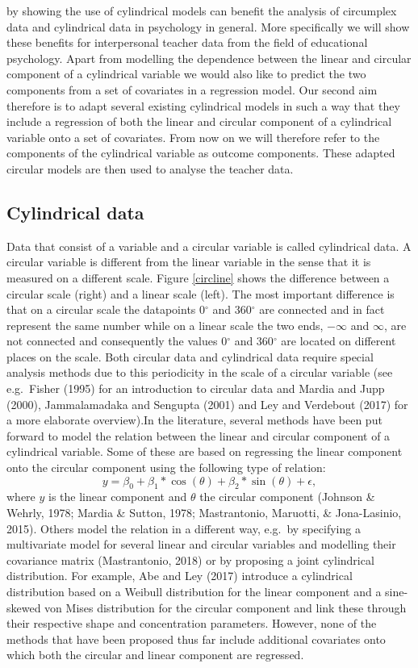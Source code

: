 \documentclass[man]{apa6}
\theoremstyle{definition}
\theoremstyle{definition}
\theoremstyle{definition}
\theoremstyle{remark}
\begin{document}
by showing the use of cylindrical models can benefit the analysis of
circumplex data and cylindrical data in psychology in general. More
specifically we will show these benefits for interpersonal teacher data
from the field of educational psychology. Apart from modelling the
dependence between the linear and circular component of a cylindrical
variable we would also like to predict the two components from a set of
covariates in a regression model. Our second aim therefore is to adapt
several existing cylindrical models in such a way that they include a
regression of both the linear and circular component of a cylindrical
variable onto a set of covariates. From now on we will therefore refer
to the components of the cylindrical variable as outcome components.
These adapted circular models are then used to analyse the teacher data.

\subsection{Cylindrical data}

Data that consist of a variable and a circular variable is called
cylindrical data. A circular variable is different from the linear
variable in the sense that it is measured on a different scale. Figure
\ref{circline} shows the difference between a circular scale (right) and
a linear scale (left). The most important difference is that on a
circular scale the datapoints 0\(^\circ\) and 360\(^\circ\) are
connected and in fact represent the same number while on a linear scale
the two ends, \(-\infty\) and \(\infty\), are not connected and
consequently the values 0\(^\circ\) and 360\(^\circ\) are located on
different places on the scale. Both circular data and cylindrical data
require special analysis methods due to this periodicity in the scale of
a circular variable (see e.g.~Fisher (1995) for an introduction to
circular data and Mardia and Jupp (2000), Jammalamadaka and Sengupta
(2001) and Ley and Verdebout (2017) for a more elaborate
overview).\newline \indent In the literature, several methods have been
put forward to model the relation between the linear and circular
component of a cylindrical variable. Some of these are based on
regressing the linear component onto the circular component using the
following type of relation: \[y = \beta_0 +
\beta_1*\cos(\theta) + \beta_2*\sin(\theta)+ \epsilon,\] where \(y\) is
the linear component and \(\theta\) the circular component (Johnson \&
Wehrly, 1978; Mardia \& Sutton, 1978; Mastrantonio, Maruotti, \&
Jona-Lasinio, 2015). Others model the relation in a different way,
e.g.~by specifying a multivariate model for several linear and circular
variables and modelling their covariance matrix (Mastrantonio, 2018) or
by proposing a joint cylindrical distribution. For example, Abe and Ley
(2017) introduce a cylindrical distribution based on a Weibull
distribution for the linear component and a sine-skewed von Mises
distribution for the circular component and link these through their
respective shape and concentration parameters. However, none of the
methods that have been proposed thus far include additional covariates
onto which both the circular and linear component are regressed.
\end{document}
